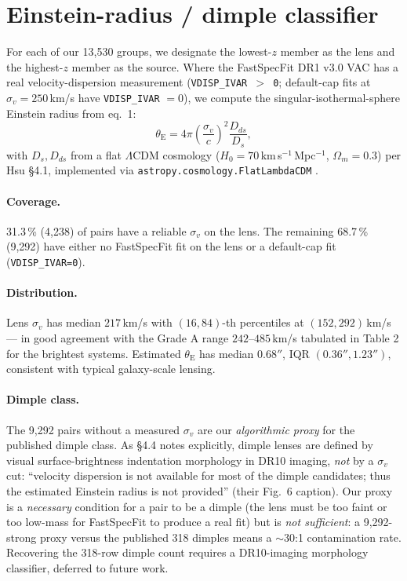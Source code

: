 \documentclass[11pt,letterpaper]{article}
\newcommand{\thetaE}{\ensuremath{\theta_{\mathrm{E}}}}
\newcommand{\sigmav}{\ensuremath{\sigma_v}}
\begin{document}
\section{Einstein-radius / dimple classifier}

For each of our 13{,}530 groups, we designate the lowest-$z$ member as
the lens and the highest-$z$ member as the source. Where the FastSpecFit
DR1 v3.0 VAC \autocite{moustakas2023fastspecfit} has a real
velocity-dispersion measurement (\texttt{VDISP\_IVAR $>$ 0}; default-cap
fits at $\sigmav = 250\,$km/s have \texttt{VDISP\_IVAR} $= 0$), we
compute the singular-isothermal-sphere Einstein radius from
\citet{hsu2025pairwise} eq.~1:
%
\begin{equation}
\thetaE = 4\pi \left( \frac{\sigmav}{c} \right)^{2}
          \frac{D_{ds}}{D_s},
\label{eq:thetaE}
\end{equation}
%
with $D_s, D_{ds}$ from a flat $\Lambda$CDM cosmology
($H_0 = 70\,$km\,s$^{-1}$\,Mpc$^{-1}$, $\Omega_m = 0.3$) per Hsu \S4.1,
implemented via \texttt{astropy.cosmology.FlatLambdaCDM}
\autocite{astropy2022}.

\paragraph{Coverage.} 31.3\,\% (4{,}238) of pairs have a reliable
$\sigmav$ on the lens. The remaining 68.7\,\% (9{,}292) have either no
FastSpecFit fit on the lens or a default-cap fit
(\texttt{VDISP\_IVAR=0}).

\paragraph{Distribution.} Lens $\sigmav$ has median $217\,$km/s with
$(16,84)$-th percentiles at $(152, 292)\,$km/s — in good agreement with
the Grade A range $242$--$485\,$km/s tabulated in
\citet{hsu2025pairwise} Table 2 for the brightest systems. Estimated
$\thetaE$ has median $0.68''$, IQR $(0.36'', 1.23'')$, consistent with
typical galaxy-scale lensing.

\paragraph{Dimple class.}
The 9{,}292 pairs without a measured $\sigmav$ are our \emph{algorithmic
proxy} for the published dimple class. As \citet{hsu2025pairwise} \S4.4
notes explicitly, dimple lenses are defined by visual surface-brightness
indentation morphology in DR10 imaging, \emph{not} by a $\sigmav$ cut:
``velocity dispersion is not available for most of the dimple
candidates; thus the estimated Einstein radius is not provided''
(their Fig.~6 caption). Our proxy is a \emph{necessary} condition for a
pair to be a dimple (the lens must be too faint or too low-mass for
FastSpecFit to produce a real fit) but is \emph{not sufficient}: a
9{,}292-strong proxy versus the published 318 dimples means a $\sim$30:1
contamination rate. Recovering the 318-row dimple count requires a
DR10-imaging morphology classifier, deferred to future work.
\end{document}
